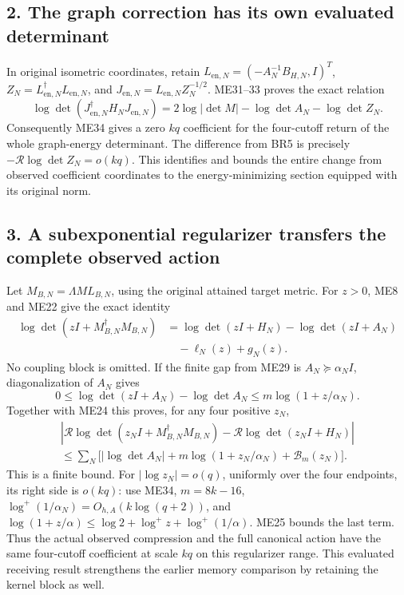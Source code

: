 \documentclass[11pt]{article}
\begin{document}
\subsection{2. The graph correction has its own evaluated determinant}\label{the-graph-correction-has-its-own-evaluated-determinant}

In original isometric coordinates, retain \(L_{\mathrm{en},N}=(-A_N^{-1}B_{H,N},I)^T\), \(Z_N=L_{\mathrm{en},N}^\dagger L_{\mathrm{en},N}\), and \(J_{\mathrm{en},N}=L_{\mathrm{en},N}Z_N^{-1/2}\). ME31--33 proves the exact relation \[
\log\det(J_{\mathrm{en},N}^\dagger H_NJ_{\mathrm{en},N})
=2\log|\det M|-\log\det A_N-\log\det Z_N.
\tag{BR6}
\] Consequently ME34 gives a zero \(kq\) coefficient for the four-cutoff return of the whole graph-energy determinant. The difference from BR5 is precisely \(-\mathcal R\log\det Z_N=o(kq)\). This identifies and bounds the entire change from observed coefficient coordinates to the energy-minimizing section equipped with its original norm.

\subsection{3. A subexponential regularizer transfers the complete observed action}\label{a-subexponential-regularizer-transfers-the-complete-observed-action}

Let \(M_{B,N}=\Lambda ML_{B,N}\), using the original attained target metric. For \(z>0\), ME8 and ME22 give the exact identity \[
\begin{split}
\log\det(zI+M_{B,N}^\dagger M_{B,N})
&=\log\det(zI+H_N)-\log\det(zI+A_N)\\
&\quad-\ell_N(z)+g_N(z).
\end{split}\tag{BR7}
\] No coupling block is omitted. If the finite gap from ME29 is \(A_N\succeq\alpha_NI\), diagonalization of \(A_N\) gives \[
0\le\log\det(zI+A_N)-\log\det A_N
\le m\log(1+z/\alpha_N).
\] Together with ME24 this proves, for any four positive \(z_N\), \[
\begin{split}
\left|\mathcal R\log\det(z_NI+M_{B,N}^\dagger M_{B,N})
-\mathcal R\log\det(z_NI+H_N)\right|\\
\le\sum_N\bigl[|\log\det A_N|
+m\log(1+z_N/\alpha_N)+\mathcal B_m(z_N)\bigr].
\end{split}\tag{BR8}
\] This is a finite bound. For \(|\log z_N|=o(q)\), uniformly over the four endpoints, its right side is \(o(kq)\): use ME34, \(m=8k-16\), \(\log^+(1/\alpha_N)=O_{h,A}(k\log(q+2))\), and \(\log(1+z/\alpha)\le\log2+\log^+z+\log^+(1/\alpha)\). ME25 bounds the last term. Thus the actual observed compression and the full canonical action have the same four-cutoff coefficient at scale \(kq\) on this regularizer range. This evaluated receiving result strengthens the earlier memory comparison by retaining the kernel block as well.
\end{document}
